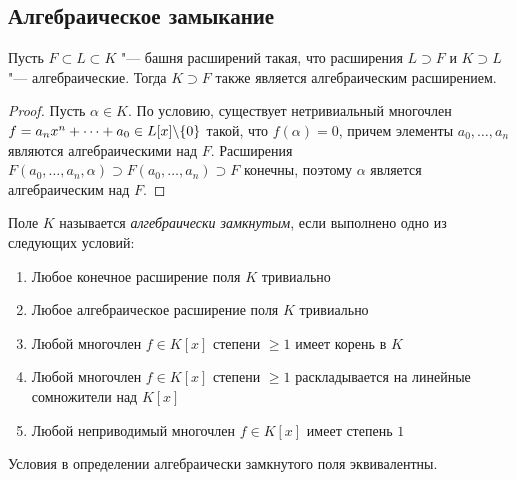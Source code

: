 \subsection{Алгебраическое замыкание}

\begin{proposition}
	Пусть $F \subset L \subset K$ "--- башня расширений такая, что расширения $L \supset F$ и $K \supset L$ "--- алгебраические. Тогда $K \supset F$ также является алгебраическим расширением.
\end{proposition}
\pagebreak
\begin{proof}
	Пусть $\alpha \in K$. По условию, существует нетривиальный многочлен $f \hm= a_nx^n + \dotsb + a_0 \in L[x] \backslash \{0\}$ такой, что $f(\alpha) = 0$, причем элементы $a_0, \dotsc, a_n$ являются алгебраическими над $F$. Расширения $F(a_0, \dotsc, a_n, \alpha) \supset F(a_0, \dotsc, a_n) \supset F$ конечны, поэтому $\alpha$ является алгебраическим над $F$.
\end{proof}

\begin{definition}
	Поле $K$ называется \textit{алгебраически замкнутым}, если выполнено одно из следующих условий:
	\begin{enumerate}
		\item Любое конечное расширение поля $K$ тривиально
		\item Любое алгебраическое расширение поля $K$ тривиально
		\item Любой многочлен $f \in K[x]$ степени $\ge 1$ имеет корень в $K$
		\item Любой многочлен $f \in K[x]$ степени $\ge 1$ раскладывается на линейные сомножители над $K[x]$
		\item Любой неприводимый многочлен $f \in K[x]$ имеет степень $1$
	\end{enumerate}
\end{definition}

\begin{proposition}
	Условия в определении алгебраически замкнутого поля эквивалентны.
\end{proposition}

